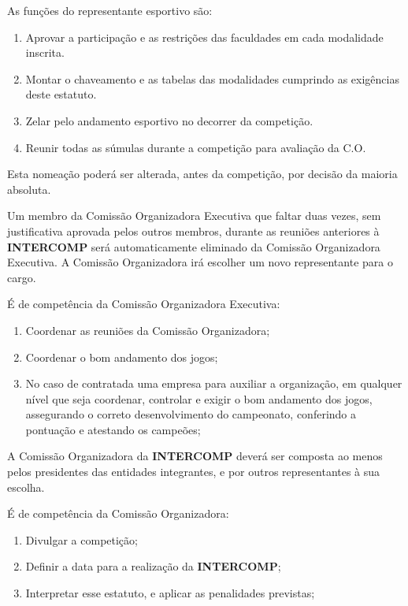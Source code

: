 \begin{article}
	\begin{xparagraph}
		As funções do representante esportivo são:
		\begin{enumerate}[noitemsep]
			\item Aprovar a participação e as restrições das faculdades em cada modalidade inscrita.
			\item Montar o chaveamento e as tabelas das modalidades cumprindo as exigências deste estatuto.
			\item Zelar pelo andamento esportivo no decorrer da competição.
			\item Reunir todas as súmulas durante a competição para avaliação da C.O.
		\end{enumerate}
	\end{xparagraph}

	\begin{xparagraph}
		Esta nomeação poderá ser alterada, antes da competição, por decisão da maioria absoluta.
	\end{xparagraph}

	\begin{xparagraph}
		Um membro da Comissão Organizadora Executiva que faltar duas vezes, sem justificativa aprovada pelos outros membros, durante as reuniões anteriores à \textbf{INTERCOMP} será automaticamente eliminado da Comissão Organizadora Executiva. A Comissão Organizadora irá escolher um novo representante para o cargo.
	\end{xparagraph}

	\begin{xparagraph}
		É de competência da Comissão Organizadora Executiva:
		\begin{enumerate}[noitemsep]
			\item Coordenar as reuniões da Comissão Organizadora;
			\item Coordenar o bom andamento dos jogos;
			\item No caso de contratada uma empresa para auxiliar a organização, em qualquer nível que seja coordenar, controlar e exigir o bom andamento dos jogos, assegurando o correto desenvolvimento do campeonato, conferindo a pontuação e atestando os campeões;
		\end{enumerate}
	\end{xparagraph}
\end{article}

\begin{article}
	A Comissão Organizadora da \textbf{INTERCOMP} deverá ser composta ao menos pelos presidentes das entidades integrantes, e por outros representantes à sua escolha.

	\begin{xparagraph}
		É de competência da Comissão Organizadora:
		\begin{enumerate}[noitemsep]
			\item Divulgar a competição;
			\item Definir a data para a realização da \textbf{INTERCOMP};
			\item Interpretar esse estatuto, e aplicar as penalidades previstas;
		\end{enumerate}
	\end{xparagraph}
\end{article}

